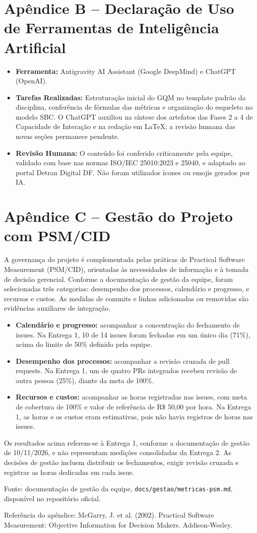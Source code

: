 \documentclass[12pt]{article}
\begin{document}
\section*{Apêndice B -- Declaração de Uso de Ferramentas de Inteligência Artificial}
\begin{itemize}
    \item \textbf{Ferramenta:} Antigravity AI Assistant (Google DeepMind) e ChatGPT (OpenAI).
    \item \textbf{Tarefas Realizadas:} Estruturação inicial do GQM no template padrão da disciplina, conferência de fórmulas das métricas e organização do esqueleto no modelo SBC. O ChatGPT auxiliou na síntese dos artefatos das Fases 2 a 4 de Capacidade de Interação e na redação em LaTeX; a revisão humana das novas seções permanece pendente.
    \item \textbf{Revisão Humana:} O conteúdo foi conferido criticamente pela equipe, validado com base nas normas ISO/IEC 25010:2023 e 25040, e adaptado ao portal Detran Digital DF. Não foram utilizados ícones ou emojis gerados por IA.
\end{itemize}

\section*{Apêndice C -- Gestão do Projeto com PSM/CID}
A governança do projeto é complementada pelas práticas de Practical Software Measurement (PSM/CID), orientadas às necessidades de informação e à tomada de decisão gerencial. Conforme a documentação de gestão da equipe, foram selecionadas três categorias: desempenho dos processos, calendário e progresso, e recursos e custos. As medidas de commits e linhas adicionadas ou removidas são evidências auxiliares de integração.

\begin{itemize}
    \item \textbf{Calendário e progresso:} acompanhar a concentração do fechamento de issues. Na Entrega 1, 10 de 14 issues foram fechadas em um único dia (71\%), acima do limite de 50\% definido pela equipe.
    \item \textbf{Desempenho dos processos:} acompanhar a revisão cruzada de pull requests. Na Entrega 1, um de quatro PRs integrados recebeu revisão de outra pessoa (25\%), diante da meta de 100\%.
    \item \textbf{Recursos e custos:} acompanhar as horas registradas nas issues, com meta de cobertura de 100\% e valor de referência de R\$ 50,00 por hora. Na Entrega 1, as horas e os custos eram estimativas, pois não havia registros de horas nas issues.
\end{itemize}
Os resultados acima referem-se à Entrega 1, conforme a documentação de gestão de 10/11/2026, e não representam medições consolidadas da Entrega 2. As decisões de gestão incluem distribuir os fechamentos, exigir revisão cruzada e registrar as horas dedicadas em cada issue.

Fonte: documentação de gestão da equipe, \texttt{docs/gestao/metricas-psm.md}, disponível no repositório oficial.

\noindent Referência do apêndice: McGarry, J. et al. (2002). Practical Software Measurement: Objective Information for Decision Makers. Addison-Wesley.
\end{document}
